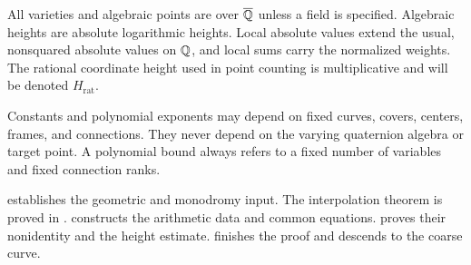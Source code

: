 All varieties and algebraic points are over \(\overline{\mathbb Q}\) unless a field is specified. Algebraic heights are absolute logarithmic heights. Local absolute values extend the usual, nonsquared absolute values on \(\mathbb Q\), and local sums carry the normalized weights. The rational coordinate height used in point counting is multiplicative and will be denoted \(H_{\mathrm{rat}}\).

Constants and polynomial exponents may depend on fixed curves, covers, centers, frames, and connections. They never depend on the varying quaternion algebra or target point. A polynomial bound always refers to a fixed number of variables and fixed connection ranks.

 establishes the geometric and monodromy input. The interpolation theorem is proved in .  constructs the arithmetic data and common equations.  proves their nonidentity and the height estimate.  finishes the proof and descends to the coarse curve.

